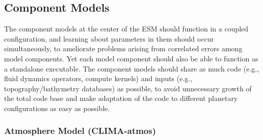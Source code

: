 \documentclass{article}
\begin{document}
\subsection{Component Models}

The component models at the center of the ESM should function in a coupled configuration, and learning about parameters in them should occur simultaneously, to ameliorate problems arising from correlated errors among model components. Yet each model component should also be able to function as a standalone executable. The component models should share as much code (e.g., fluid dynamics operators, compute kernels) and inputs (e.g., topography/bathymetry databases) as possible, to avoid unnecessary growth of the total code base and make adaptation of the code to different planetary configurations as easy as possible.

\subsubsection{Atmosphere Model (CLIMA-atmos)}
\end{document}
